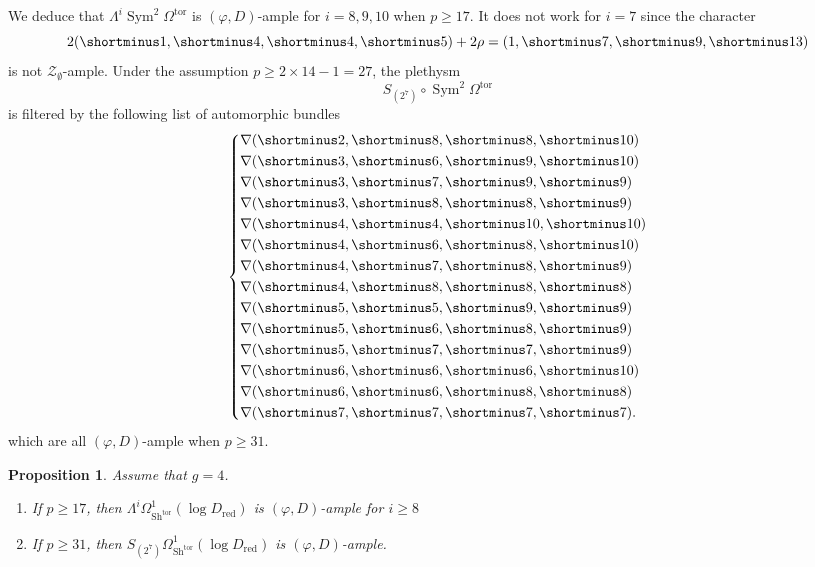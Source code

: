 \documentclass[11pt]{amsart}
\numberwithin{subsection}{section}
\numberwithin{figure}{section}
\numberwithin{table}{section}
\theoremstyle{1}
\newtheorem{proposition}[theorem]{Proposition}
\theoremstyle{2}
\DeclareMathOperator{\Sh}{Sh}
\DeclareMathOperator{\Sym}{Sym}
\DeclareMathOperator{\tor}{tor}
\DeclareMathOperator{\red}{red}
\begin{document}
We deduce that $\Lambda^{i}\Sym^2 \Omega^{\tor}$ is $(\varphi,D)$-ample for $i = 8,9,10$ when $p \geq 17$. It does not work for $i = 7$ since the character
\begin{equation*}
2(\shortminus1,\shortminus4,\shortminus4,\shortminus 5) + 2\rho = (1,\shortminus7,\shortminus 9, \shortminus 13)
\end{equation*}
is not $\mathcal{Z}_{\emptyset}$-ample. Under the assumption $p \geq 2\times 14-1 = 27$, the plethysm
\begin{equation*}
S_{(2^7)} \circ \Sym^2 \Omega^{\tor}
\end{equation*}
is filtered by the following list of automorphic bundles
\begin{equation*}
\left\{
\begin{aligned}
&\nabla(\shortminus 2,\shortminus 8,\shortminus8, \shortminus 10) \\
&\nabla(\shortminus 3,\shortminus 6,\shortminus 9, \shortminus 10) \\
&\nabla(\shortminus 3,\shortminus 7 ,\shortminus9, \shortminus 9) \\
&\nabla(\shortminus 3,\shortminus 8,\shortminus 8, \shortminus 9) \\
&\nabla(\shortminus 4,\shortminus 4 ,\shortminus 10, \shortminus 10) \\
&\nabla(\shortminus 4,\shortminus 6,\shortminus 8, \shortminus 10) \\
&\nabla(\shortminus 4,\shortminus 7,\shortminus 8, \shortminus 9) \\
&\nabla(\shortminus4,\shortminus 8,\shortminus 8, \shortminus 8) \\
&\nabla(\shortminus 5,\shortminus 5,\shortminus 9, \shortminus 9) \\
&\nabla(\shortminus 5,\shortminus 6,\shortminus 8, \shortminus 9) \\
&\nabla(\shortminus 5,\shortminus 7,\shortminus 7, \shortminus 9) \\
&\nabla(\shortminus 6,\shortminus 6,\shortminus 6, \shortminus 10) \\
&\nabla(\shortminus 6,\shortminus 6,\shortminus 8, \shortminus 8) \\
&\nabla(\shortminus 7,\shortminus 7,\shortminus 7, \shortminus 7).
\end{aligned}
\right.
\end{equation*}
which are all $(\varphi,D)$-ample when $p \geq 31$.
\begin{proposition}
Assume that $g = 4$. 
\begin{enumerate}
\item If $p\geq 17$, then $\Lambda^{i}\Omega^1_{\Sh^{\tor}}(\log D_{\red})$ is $(\varphi,D)$-ample for $i \geq 8$ 
\item If $p \geq 31$, then $S_{(2^7)}\Omega^1_{\Sh^{\tor}}(\log D_{\red})$ is $(\varphi,D)$-ample. 
\end{enumerate}
\end{proposition}
\end{document}
